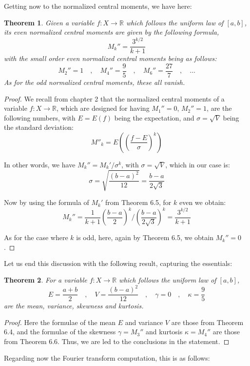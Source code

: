 \documentclass[12pt]{amsbook}
\newtheorem{theorem}{Theorem}[chapter]
\begin{document}
Getting now to the normalized central moments, we have here:

\begin{theorem}
Given a variable $f:X\to\mathbb R$ which follows the uniform law of $[a,b]$, its even normalized central moments are given by the following formula,
$$M_k''=\frac{3^{k/2}}{k+1}$$
with the small order even normalized central moments being as follows:
$$M_2''=1\quad,\quad 
M_4''=\frac{9}{5}\quad,\quad
M_6''=\frac{27}{7}\quad,\quad\ldots$$
As for the odd normalized central moments, these all vanish.
\end{theorem}

\begin{proof}
We recall from chapter 2 that the normalized central moments of a variable $f:X\to\mathbb R$, which are designed for having $M_1''=0$, $M_2''=1$, are the following numbers, with $E=E(f)$ being the expectation, and $\sigma=\sqrt{V}$ being the standard deviation:
$$M''_k=E\left(\left(\frac{f-E}{\sigma}\right)^k\right)$$

In other words, we have $M_k''=M_k'/\sigma^k$, with $\sigma=\sqrt{V}$, which in our case is:
$$\sigma=\sqrt{\frac{(b-a)^2}{12}}=\frac{b-a}{2\sqrt{3}}$$

Now by using the formula of $M_k'$ from Theorem 6.5, for $k$ even we obtain:
$$M_k''=\frac{1}{k+1}\left(\frac{b-a}{2}\right)^k\Big/\left(\frac{b-a}{2\sqrt{3}}\right)^k
=\frac{3^{k/2}}{k+1}$$

As for the case where $k$ is odd, here, again by Theorem 6.5, we obtain $M_k''=0$. 
\end{proof}

Let us end this discussion with the following result, capturing the essentials:

\begin{theorem}
For a variable $f:X\to\mathbb R$ which follows the uniform law of $[a,b]$,
$$E=\frac{a+b}{2}\quad,\quad V=\frac{(b-a)^2}{12}\quad,\quad\gamma=0\quad,\quad\kappa=\frac{9}{5}$$
are the mean, variance, skewness and kurtosis. 
\end{theorem}

\begin{proof}
Here the formulae of the mean $E$ and variance $V$ are those from Theorem 6.4, and the formulae of the skewness $\gamma=M_3''$ and kurtosis $\kappa=M_4''$ are those from Theorem 6.6. Thus, we are led to the conclusions in the statement.
\end{proof}

Regarding now the Fourier transform computation, this is as follows:
\end{document}
